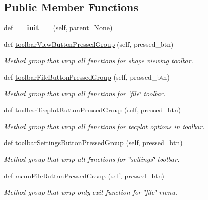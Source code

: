\subsection*{Public Member Functions}
\begin{DoxyCompactItemize}
\item 
\hypertarget{a00079_a10b91a0caafffe00be0f4fa9c7a022dc}{}\label{a00079_a10b91a0caafffe00be0f4fa9c7a022dc} 
def {\bfseries \+\_\+\+\_\+init\+\_\+\+\_\+} (self, parent=None)
\item 
def \hyperlink{a00079_ade955a1fc8334b12726d9f462ed25c62}{toolbar\+View\+Button\+Pressed\+Group} (self, pressed\+\_\+btn)
\begin{DoxyCompactList}\small\item\em Method group that wrap all functions for shape viewing toolbar. \end{DoxyCompactList}\item 
def \hyperlink{a00079_ab5cf733dc40f2b17761056148fd51263}{toolbar\+File\+Button\+Pressed\+Group} (self, pressed\+\_\+btn)
\begin{DoxyCompactList}\small\item\em Method group that wrap all functions for \char`\"{}file\char`\"{} toolbar. \end{DoxyCompactList}\item 
def \hyperlink{a00079_aabfc46144de45158b8d9c8952cfa1a7d}{toolbar\+Tecplot\+Button\+Pressed\+Group} (self, pressed\+\_\+btn)
\begin{DoxyCompactList}\small\item\em Method group that wrap all functions for tecplot options in toolbar. \end{DoxyCompactList}\item 
def \hyperlink{a00079_abe6ec5c591c19b280f2e24bb198a1d6b}{toolbar\+Settings\+Button\+Pressed\+Group} (self, pressed\+\_\+btn)
\begin{DoxyCompactList}\small\item\em Method group that wrap all functions for \char`\"{}settings\char`\"{} toolbar. \end{DoxyCompactList}\item 
def \hyperlink{a00079_aedcbcf23c32b9661d48f28e11c0c7172}{menu\+File\+Button\+Pressed\+Group} (self, pressed\+\_\+btn)
\begin{DoxyCompactList}\small\item\em Method group that wrap only exit function for \char`\"{}file\char`\"{} menu. \end{DoxyCompactList}\item 

\end{DoxyCompactItemize}
